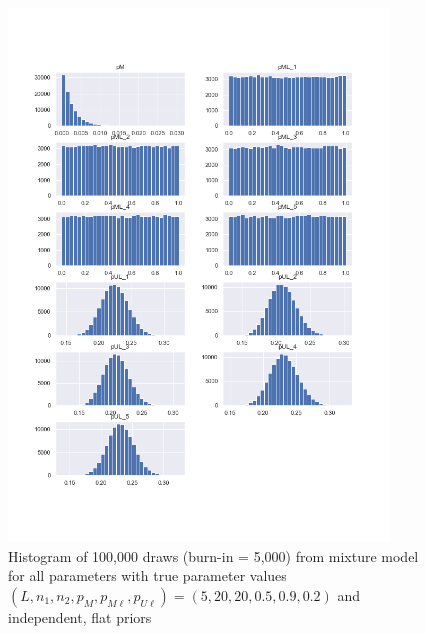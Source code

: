 \documentclass[11pt,reqno]{amsart}
\begin{document}
\begin{figure}[htbp]
\begin{center}
\includegraphics[width=0.9\textwidth]{../Figures/mm/nM10/allParam_nM10_L5.png}
\vspace{-40pt}
\caption{Histogram of 100,000 draws (burn-in = 5,000) from mixture model for all parameters with true parameter values $(L, n_1, n_2, p_M, p_{M\ell}, p_{U\ell}) = (5, 20, 20, 0.5, 0.9, 0.2)$ and independent, flat priors}
\label{mmLarge}
\end{center}
\end{figure}
\end{document}
